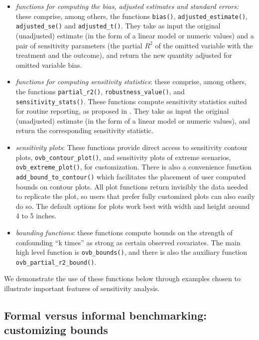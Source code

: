 \documentclass[
]{jss}
\begin{document}
\begin{itemize}
\item
  \emph{functions for computing the bias, adjusted estimates and
  standard errors:} these comprise, among others, the functions
  \texttt{bias()}, \texttt{adjusted\_estimate()},
  \texttt{adjusted\_se()} and \texttt{adjusted\_t()}. They take as input
  the original (unadjusted) estimate (in the form of a linear model or
  numeric values) and a pair of sensitivity parameters (the partial
  \(R^2\) of the omitted variable with the treatment and the outcome),
  and return the new quantity adjusted for omitted variable bias.
\item
  \emph{functions for computing sensitivity statistics}: these comprise,
  among others, the functions \texttt{partial\_r2()},
  \texttt{robustness\_value()}, and \texttt{sensitivity\_stats()}. These
  functions compute sensitivity statistics suited for routine reporting,
  as proposed in \citet{cinelli:jrssb2019}. They take as input the
  original (unadjusted) estimate (in the form of a linear model or
  numeric values), and return the corresponding sensitivity statistic.
\item
  \emph{sensitivity plots}: These functions provide direct access to
  sensitivity contour plots, \texttt{ovb\_contour\_plot()}, and
  sensitivity plots of extreme scenarios, \texttt{ovb\_extreme\_plot()},
  for customization. There is also a convenience function
  \texttt{add\_bound\_to\_contour()} which facilitates the placement of
  user computed bounds on contour plots. All plot functions return
  invisibly the data needed to replicate the plot, so users that prefer
  fully customized plots can also easily do so. The default options for
  plots work best with width and height around 4 to 5 inches.
\item
  \emph{bounding functions}: these functions compute bounds on the
  strength of confounding ``k times'' as strong as certain observed
  covariates. The main high level function is \texttt{ovb\_bounds()},
  and there is also the auxiliary function
  \texttt{ovb\_partial\_r2\_bound()}.
\end{itemize}

We demonstrate the use of these functions below through examples chosen
to illustrate important features of sensitivity analysis.

\hypertarget{informal}{%
\subsection{Formal versus informal benchmarking: customizing
bounds}\label{informal}}
\end{document}

